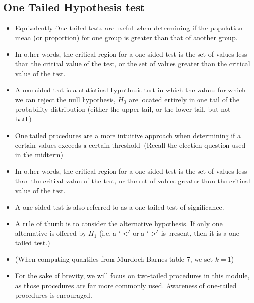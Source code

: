 \documentclass[a4paper,12pt]{article}
\begin{document}
\subsection*{One Tailed Hypothesis test}
\begin{itemize}


\item Equivalently One-tailed tests are useful when determining if the population mean  (or proportion) for one group is greater than that of another group.

\item In other words, the critical region for a one-sided test is the set of values less than the critical value of the test, or the set of values greater than the critical value of the test.



	
	\item A one-sided test is a statistical hypothesis test in which the values for which we can reject the null hypothesis, $H_0$ are located entirely in one tail of the probability distribution (either the upper tail, or the lower tail, but not both).

\item One tailed procedures are a more intuitive approach when determining if a certain values exceeds a certain threshold. (Recall the election question used in the midterm)

	
	\item In other words, the critical region for a one-sided test is the set of values less than the critical value of the test, or the set of values greater than the critical value of the test.
	
	\item A one-sided test is also referred to as a one-tailed test of significance.
	
	\item A rule of thumb is to consider the alternative hypothesis.  If only one alternative is offered by $H_1$ (i.e. a $`<'$ or a $`>'$ is present, then it is a one tailed test.)
	\item (When computing quantiles from Murdoch Barnes table 7, we set $k=1$)

\item  For the sake of brevity, we will focus on two-tailed procedures in this module, as those procedures are far more commonly used. Awareness of one-tailed procedures is encouraged.
\end{itemize}

\end{document}
